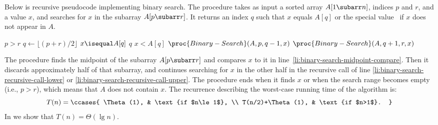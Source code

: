 Below is recursive pseudocode implementing binary search.
The procedure takes as input a sorted array $A[1\subarr n]$, indices $p$ and $r$, and a value $x$, and searches for $x$ in the subarray $A[p\subarr r]$.
It returns an index $q$ such that $x$ equals $A[q]$ or the special value \nil\ if $x$ does not appear in $A$.

\begin{codebox}
\li \If $p>r$
\li     \Then \Return \nil \label{li:binary-search-not-found}
        \End
\li $q\gets\lfloor(p+r)/2\rfloor$
\li \If $x\isequal A[q]$ \label{li:binary-search-midpoint-compare}
\li     \Then \Return $q$
        \End
\li \If $x<A[q]$
\li     \Then \Return $\proc{Binary-Search}(A,p,q-1,x)$ \label{li:binary-search-recursive-call-lower}
\li     \Else \Return $\proc{Binary-Search}(A,q+1,r,x)$ \label{li:binary-search-recursive-call-upper}
        \End
\end{codebox}

The procedure finds the midpoint of the subarray $A[p\subarr r]$ and compares $x$ to it in line~\ref{li:binary-search-midpoint-compare}.
Then it discards approximately half of that subarray, and continues searching for $x$ in the other half in the recursive call of line \ref{li:binary-search-recursive-call-lower} or \ref{li:binary-search-recursive-call-upper}.
The procedure ends when it finds $x$ or when the search range becomes empty (i.e., $p>r$), which means that $A$ does not contain $x$.
The recurrence describing the worst-case running time of the algorithm is:
\[
    T(n) =
    \ccases{
        \Theta(1), & \text{if $n\le1$}, \\
        T(n/2)+\Theta(1), & \text{if $n>1$}.
    }
\]
In  we show that $T(n)=\Theta(\lg n)$.
